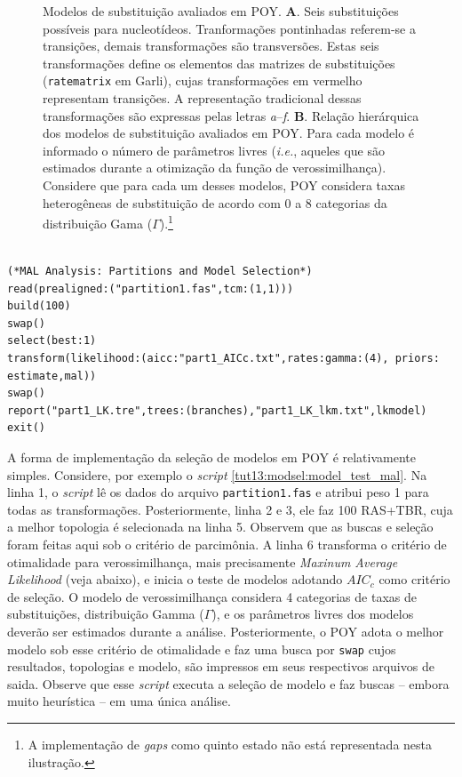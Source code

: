\begin{refsection}
\begin{figure}[h!]
    {\caption[Modelos de substituição avaliados em POY]{Modelos de substituição avaliados em POY. \textbf{A}. Seis substituições possíveis para nucleotídeos. Tranformações pontinhadas referem-se a transições, demais transformações são transversões. Estas seis transformações define os elementos das matrizes de substituições (\texttt{ratematrix} em Garli), cujas transformações em vermelho representam transições. A representação tradicional dessas transformações são expressas pelas letras \textit{a}--\textit{f}. \textbf{B}. Relação hierárquica dos modelos de substituição avaliados em POY. Para cada modelo é informado o número de parâmetros livres (\textit{i.e.}, aqueles que são estimados durante a otimização da função de verossimilhança). Considere que para cada um desses modelos, POY considera taxas heterogêneas de substituição de acordo com 0 a 8 categorias da distribuição Gama ($\Gamma$).\footnote{A implementação de \textit{gaps} como quinto estado não está representada nesta ilustração.}}\label{tut13:fig:models}}
  \end{figure}

\scriptsize
\begin{lstlisting}[caption= conteúdo do arquivo \texttt{model\_test\_part1.poy}.,label=tut13:modsel:model_test_mal]

(*MAL Analysis: Partitions and Model Selection*)
read(prealigned:("partition1.fas",tcm:(1,1)))
build(100)
swap()
select(best:1)
transform(likelihood:(aicc:"part1_AICc.txt",rates:gamma:(4), priors: estimate,mal))
swap()
report("part1_LK.tre",trees:(branches),"part1_LK_lkm.txt",lkmodel)
exit()

\end{lstlisting}
\normalsize

A forma de implementação da seleção de modelos em POY é relativamente simples. Considere, por exemplo o \textit{script} \ref{tut13:modsel:model_test_mal}. Na linha 1, o \textit{script} lê os dados do arquivo \texttt{partition1.fas} e atribui peso 1 para todas as transformações. Posteriormente, linha 2 e 3, ele faz 100 RAS+TBR, cuja a melhor topologia é selecionada na linha 5. Observem que as buscas e seleção foram feitas aqui sob o critério de parcimônia. A linha 6 transforma o critério de otimalidade para verossimilhança, mais precisamente \textit{Maxinum Average Likelihood} (veja abaixo), e inicia o teste de modelos adotando $AIC_{c}$ como critério de seleção. O modelo de verossimilhança considera 4 categorias de taxas de substituições, distribuição Gamma ($\Gamma$), e os parâmetros livres dos modelos deverão ser estimados durante a análise. Posteriormente, o POY adota o melhor modelo sob esse critério de otimalidade e faz uma busca por \texttt{swap} cujos resultados, topologias e modelo, são impressos em seus respectivos arquivos de saida. Observe que esse \textit{script} executa a seleção de modelo e faz buscas -- embora muito heurística -- em uma única análise.


\end{refsection}
